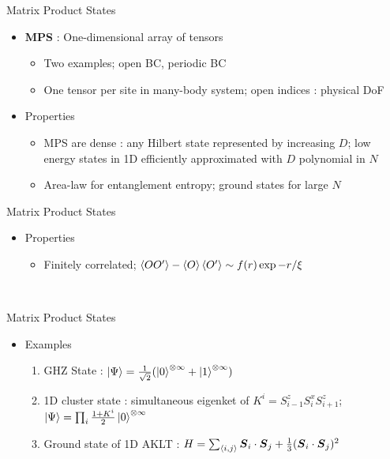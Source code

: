 \documentclass{beamer}
\begin{document}
\begin{frame}{Matrix Product States}
	\begin{itemize}
		\item \textbf{MPS} : One-dimensional array of tensors
	\\
		\begin{itemize}
		\item Two examples; open BC, periodic BC
		\item One tensor per site in many-body system; open indices : physical DoF
		\end{itemize}
	\item Properties
		\begin{itemize}
		\item MPS are dense : any Hilbert state represented by increasing $D$; low energy states in 1D efficiently approximated with $D$ polynomial in $N$
		\item Area-law for entanglement entropy; ground states for large $N$
		\end{itemize}
	\end{itemize}
\end{frame}
\begin{frame}{Matrix Product States}
	\begin{itemize}
		\item Properties
		\begin{itemize}
		\item Finitely correlated; $\ev{O O^{\prime}}-\ev{O}\ev{O^{\prime}}\sim f(r)\exp -r/\xi$  
		\end{itemize}
	\end{itemize}
	\\
\end{frame}

\begin{frame}{Matrix Product States}
	\begin{itemize}
		\item Examples
	\\
	\begin{enumerate}
		\item GHZ State : $\ket{\Psi}=\frac{1}{\sqrt{2}}(\ket{0}^{\otimes \infty}+\ket{1}^{\otimes \infty})$
		\item 1D cluster state : simultaneous eigenket of $K^{i}=S^{z}_{i-1}S^{x}_iS^z_{i+1}$; $\ket{\Psi }=\prod_i \frac{1+K^{i}}{2}\ket{0}^{\otimes \infty}$
		\item Ground state of 1D AKLT : $H=\sum_{\ev{i,j}}^{}\boldsymbol{S}_i\cdot\boldsymbol{S}_j+\frac{1}{3}(\boldsymbol{S}_i\cdot\boldsymbol{S}_j)^2 $
		\end{enumerate}
	\end{itemize}
\end{frame}
\end{document}

